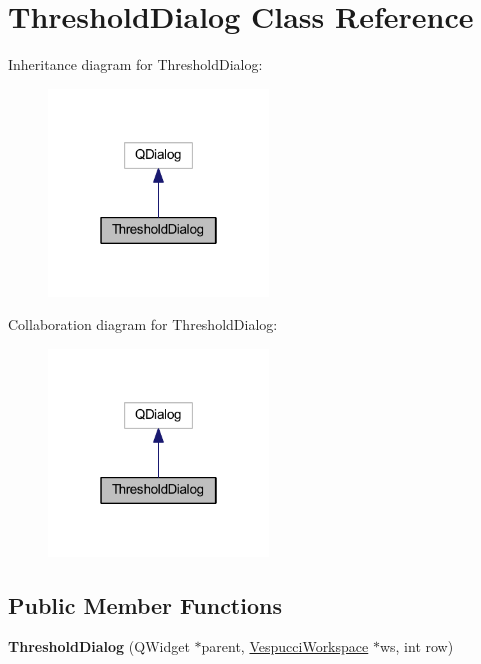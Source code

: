 \hypertarget{class_threshold_dialog}{\section{Threshold\+Dialog Class Reference}
\label{class_threshold_dialog}
}


Inheritance diagram for Threshold\+Dialog\+:\nopagebreak
\begin{figure}[H]
\begin{center}
\leavevmode
\includegraphics[width=166pt]{class_threshold_dialog__inherit__graph}
\end{center}
\end{figure}


Collaboration diagram for Threshold\+Dialog\+:\nopagebreak
\begin{figure}[H]
\begin{center}
\leavevmode
\includegraphics[width=166pt]{class_threshold_dialog__coll__graph}
\end{center}
\end{figure}
\subsection*{Public Member Functions}
\begin{DoxyCompactItemize}
\item 
\hypertarget{class_threshold_dialog_ad2edf69c114188345c1c9a88552f7a7a}{{\bfseries Threshold\+Dialog} (Q\+Widget $\ast$parent, \hyperlink{class_vespucci_workspace}{Vespucci\+Workspace} $\ast$ws, int row)}\label{class_threshold_dialog_ad2edf69c114188345c1c9a88552f7a7a}

\end{DoxyCompactItemize}


